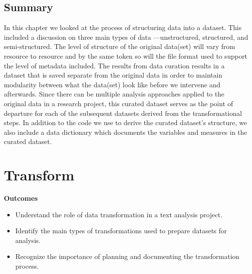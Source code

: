 \documentclass[
  letterpaper,
  krantz1]{latex/krantz-mod}
\providecommand{\tightlist}{%
  \setlength{\itemsep}{0pt}\setlength{\parskip}{0pt}}\usepackage{longtable,booktabs,array}
\newcommand{\setDOI}[1]{%
  \gdef\doi{%
    \footnotesize%
    #1\par%
    This chapter has been made available under a CC-BY-NC-ND license.%
  }%
}
\theoremstyle{definition}
\theoremstyle{definition}
\theoremstyle{remark}
\begin{document}
\section*{Summary}\label{summary-5}


In this chapter we looked at the process of structuring data into a
dataset. This included a discussion on three main types of data
---unstructured, structured, and semi-structured. The level of structure
of the original data(set) will vary from resource to resource and by the
same token so will the file format used to support the level of metadata
included. The results from data curation results in a dataset that is
saved separate from the original data in order to maintain modularity
between what the data(set) look like before we intervene and afterwards.
Since there can be multiple analysis approaches applied to the original
data in a research project, this curated dataset serves as the point of
departure for each of the subsequent datasets derived from the
transformational steps. In addition to the code we use to derive the
curated dataset's structure, we also include a data dictionary which
documents the variables and measures in the curated dataset.

\chapter{Transform}\label{sec-transform-chapter}

\setDOI{10.4324/9781003393764.7}
\thispagestyle{chapterfirstpage}

\begin{tcolorbox}[enhanced jigsaw, toprule=.15mm, breakable, colback=white, arc=.35mm, left=2mm, colframe=quarto-callout-color-frame, opacityback=0, bottomrule=.15mm, rightrule=.15mm, leftrule=.75mm]

\textbf{ Outcomes}

\begin{itemize}
\tightlist
\item
  Understand the role of data transformation in a text analysis project.
\item
  Identify the main types of transformations used to prepare datasets
  for analysis.
\item
  Recognize the importance of planning and documenting the
  transformation process.
\end{itemize}

\end{tcolorbox}
\end{document}
